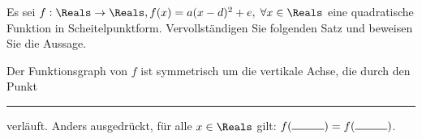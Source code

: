 \documentclass[12pt]{article}
\begin{document}
\begin{exercise}\label{ex:symmetrieachse}
Es sei $f: \Reals \rightarrow \Reals, f(x) = a(x-d)^2 + e, \; \forall x \in \Reals$ eine quadratische Funktion in Scheitelpunktform.
Vervollständigen Sie folgenden Satz und beweisen Sie die Aussage.

Der Funktionsgraph von $f$ ist symmetrisch um die vertikale Achse, die durch den Punkt \rule{1cm}{0.5pt} verläuft. Anders ausgedrückt, für alle $x \in \Reals$ gilt: $f(\rule{1cm}{0.5pt}) = f(\rule{1cm}{0.5pt})$.
\end{exercise}
\end{document}
